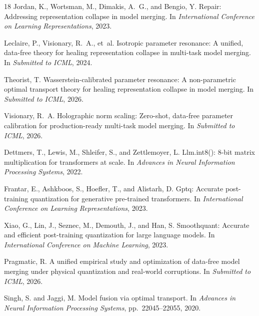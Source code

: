 \documentclass{article}
\theoremstyle{plain}
\theoremstyle{definition}
\theoremstyle{remark}
\begin{document}
\begin{thebibliography}{18}
Jordan, K., Wortsman, M., Dimakis, A.~G., and Bengio, Y.
\newblock Repair: Addressing representation collapse in model merging.
\newblock In \emph{International Conference on Learning Representations}, 2023.

Leclaire, P., Visionary, R.~A., et~al.
\newblock Isotropic parameter resonance: A unified, data-free theory for healing representation collapse in multi-task model merging.
\newblock In \emph{Submitted to ICML}, 2024.

Theorist, T.
\newblock Wasserstein-calibrated parameter resonance: A non-parametric optimal transport theory for healing representation collapse in model merging.
\newblock In \emph{Submitted to ICML}, 2026.

Visionary, R.~A.
\newblock Holographic norm scaling: Zero-shot, data-free parameter calibration for production-ready multi-task model merging.
\newblock In \emph{Submitted to ICML}, 2026.

Dettmers, T., Lewis, M., Shleifer, S., and Zettlemoyer, L.
\newblock Llm.int8(): 8-bit matrix multiplication for transformers at scale.
\newblock In \emph{Advances in Neural Information Processing Systems}, 2022.

Frantar, E., Ashkboos, S., Hoefler, T., and Alistarh, D.
\newblock Gptq: Accurate post-training quantization for generative pre-trained transformers.
\newblock In \emph{International Conference on Learning Representations}, 2023.

Xiao, G., Lin, J., Seznec, M., Demouth, J., and Han, S.
\newblock Smoothquant: Accurate and efficient post-training quantization for large language models.
\newblock In \emph{International Conference on Machine Learning}, 2023.

Pragmatic, R.
\newblock A unified empirical study and optimization of data-free model merging under physical quantization and real-world corruptions.
\newblock In \emph{Submitted to ICML}, 2026.

Singh, S. and Jaggi, M.
\newblock Model fusion via optimal transport.
\newblock In \emph{Advances in Neural Information Processing Systems}, pp.\ 22045--22055, 2020.


\end{thebibliography}
\end{document}
